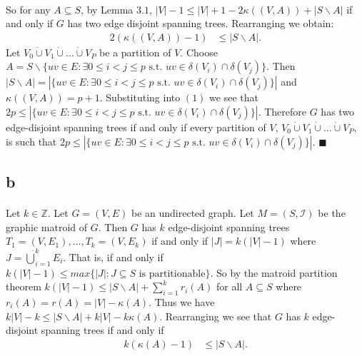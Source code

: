 \documentclass[letterpaper,12pt,oneside,onecolumn]{report}
\begin{document}
\paragraph{}
So for any $A \subseteq S$, by Lemma $3.1$, $|V| - 1 \leq |V| + 1 - 2\kappa((V,A)) + |S\backslash A|$ if and only if $G$ has two edge disjoint spanning trees. Rearranging we obtain:
\begin{align}
2(\kappa((V,A)) - 1) &\leq |S\backslash A|.
\end{align}
Let $V_0 \dot\cup V_1 \dot\cup \dots \dot\cup V_P$ be a partition of $V$. Choose $A =S \backslash \{uv \in E : \exists 0\leq i < j \leq p \text{ s.t. } uv \in \delta(V_i) \cap \delta(V_j) \}$. Then $|S\backslash A| = |\{uv \in E : \exists 0\leq i < j \leq p \text{ s.t. } uv \in \delta(V_i) \cap \delta(V_j) \}|$ and $\kappa((V,A)) = p+1$. Substituting into $(1)$ we see that $2p \leq |\{uv \in E : \exists 0\leq i < j \leq p \text{ s.t. } uv \in \delta(V_i) \cap \delta(V_j) \}|$. Therefore $G$ has two edge-disjoint spanning trees if and only if every partition of $V$, $V_0 \dot\cup V_1 \dot\cup \dots \dot\cup V_P$, is such that $2p \leq |\{uv \in E : \exists 0\leq i < j \leq p \text{ s.t. } uv \in \delta(V_i) \cap \delta(V_j) \}|$. $\blacksquare$
\subsection*{b}
\paragraph{}
Let $k \in \mathbb{Z}$. Let $G=(V,E)$ be an undirected graph. Let $M = (S,\mathcal{I})$ be the graphic matroid of $G$. Then $G$ has $k$ edge-disjoint spanning trees $T_1 = (V,E_1), \dots, T_k = (V,E_k)$ if and only if $|J| = k(|V| - 1)$ where $J = \dot\bigcup_{i=1}^k E_i$. That is, if and only if $k(|V| - 1) \leq max\{ |J| : J\subseteq S \text{ is partitionable}\}$. So by the matroid partition theorem $k(|V| - 1) \leq |S\backslash A| + \sum_{i=1}^k r_i(A)$ for all $A \subseteq S$ where $r_i(A) = r(A) = |V| - \kappa(A)$. Thus we have $k|V| - k \leq |S\backslash A| + k|V| -k\kappa(A)$. Rearranging we see that $G$ has $k$ edge-disjoint spanning trees if and only if 
\begin{align}
k(\kappa(A) - 1) &\leq |S \backslash A|.
\end{align}
\end{document}
